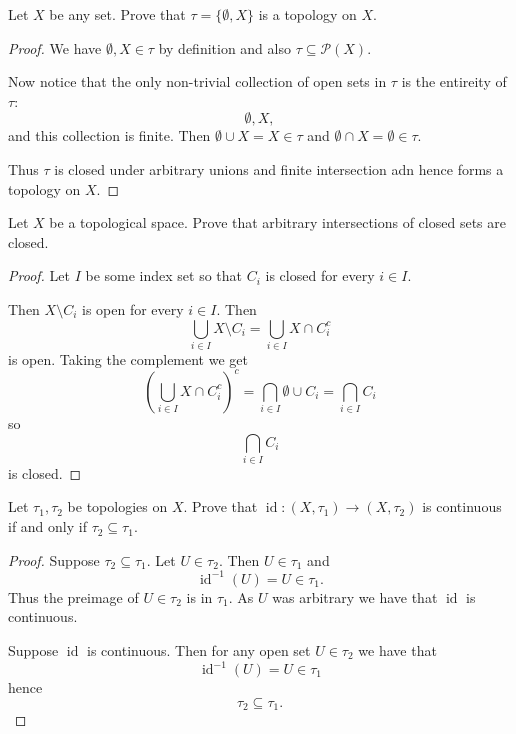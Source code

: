 \begin{prob}
    Let $X$ be any set. Prove that $\tau = \{\emptyset, X\}$ 
    is a topology on $X$. 
\end{prob}
\begin{proof}
    We have $\emptyset, X \in \tau$ by definition and also 
    $\tau \subseteq \mathcal P(X)$. 

    Now notice that the only non-trivial collection 
    of open sets in $\tau$ is the entireity of 
    $\tau$: 
    \[
        \emptyset, X,
    \]
    and this collection is finite. 
    Then $\emptyset \cup X = X \in \tau$ and 
    $\emptyset \cap X = \emptyset \in \tau$. 

    Thus $\tau$ is closed under arbitrary unions 
    and finite intersection adn hence forms a topology 
    on $X$. 
\end{proof}
\begin{prob}
    Let $X$ be a topological space. Prove that arbitrary intersections 
    of closed sets are closed. 
\end{prob}
\begin{proof}
    Let $I$ be some index set so that 
    $C_i$ is closed for every $i \in I$. 

    Then $X \setminus C_i$ is open for every $i \in I$. 
    Then 
    \[
        \bigcup_{i\in I}X \setminus C_i
        = \bigcup_{i\in I} X \cap C_i^c 
    \]
    is open. 
    Taking the complement we get 
    \[
        \left(\bigcup_{i\in I} X \cap C_i^c\right)^c
        = \bigcap_{i\in I} \emptyset \cup C_i 
        = \bigcap_{i \in I} C_i
    \]
    so 
    \[
        \bigcap_{i\in I} C_i  
    \]
    is closed. 
\end{proof}

\begin{prob}
    Let $\tau_1,\tau_2$ be topologies on $X$. Prove that 
    $\operatorname{id} : (X, \tau_1) \to (X, \tau_2)$ is 
    continuous if and only if $\tau_2 \subseteq \tau_1$. 
\end{prob}
\begin{proof}
    Suppose $\tau_2 \subseteq \tau_1$. 
    Let $U \in \tau_2$. Then $U \in \tau_1$ and 
    \[
        \operatorname{id}^{-1}(U) = U \in \tau_1.
    \]
    Thus the preimage of $U \in \tau_2$ is in $\tau_1$. 
    As $U$ was arbitrary we have that $\operatorname{id}$ 
    is continuous. 

    Suppose $\operatorname{id}$ is continuous. Then for any open set 
    $U \in \tau_2$ we have that 
    \[
        \operatorname{id}^{-1}(U) = U \in \tau_1
    \]
    hence 
    \[
        \tau_2 \subseteq \tau_1.
    \]
\end{proof}


